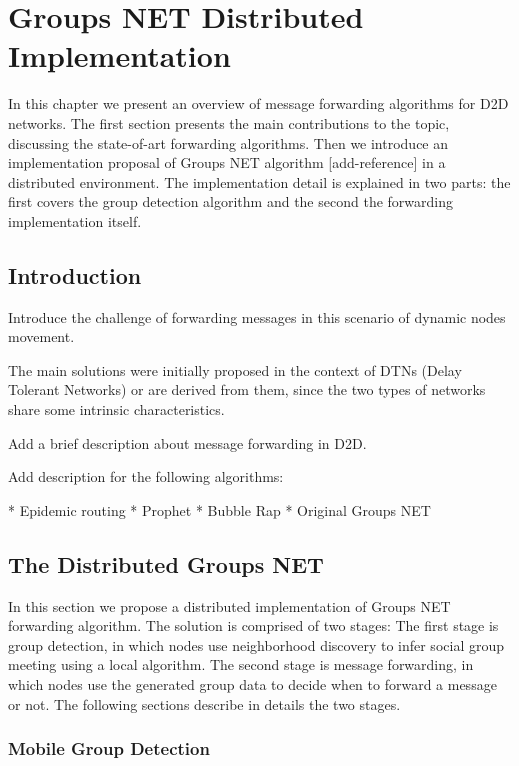 \chapter{Groups NET Distributed Implementation}
\label{ch:GroupsNet}

In this chapter we present an overview of message forwarding algorithms for D2D networks. The first section
presents the main contributions to the topic, discussing the state-of-art forwarding algorithms. Then we introduce
an implementation proposal of Groups NET algorithm [add-reference] in a distributed environment.
The implementation detail is explained in two parts: the first covers the group detection algorithm and the
second the forwarding implementation itself.

\section{Introduction}

Introduce the challenge of forwarding messages in this scenario of dynamic nodes movement.

The main solutions were initially proposed in the context of DTNs (Delay Tolerant Networks) or are derived from them,
since the two types of networks share some intrinsic characteristics.

Add a brief description about message forwarding in D2D.

Add description for the following algorithms:

* Epidemic routing
* Prophet
* Bubble Rap
* Original Groups NET

\section{The Distributed Groups NET}

In this section we propose a distributed implementation of Groups NET forwarding algorithm. The solution is
comprised of two stages: The first stage is group detection, in which nodes use neighborhood discovery to
infer social group meeting using a local algorithm. The second stage is message forwarding, in which nodes
use the generated group data to decide when to forward a message or not. The following sections describe in
details the two stages.

\subsection{Mobile Group Detection}

